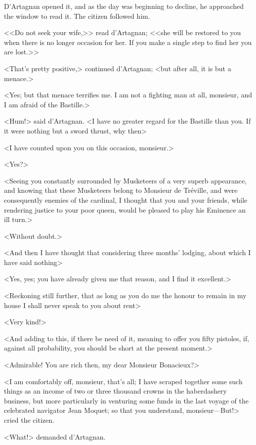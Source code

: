 D'Artagnan opened it, and as the day was beginning to decline, he approached the window to read it. The citizen followed him. 

<<Do not seek your wife,>> read d'Artagnan; <<she will be restored to you when there is no longer occasion for her. If you make a single step to find her you are lost.>>

<That's pretty positive,> continued d'Artagnan; <but after all, it is but a menace.> 

<Yes; but that menace terrifies me. I am not a fighting man at all, monsieur, and I am afraid of the Bastille.> 

<Hum!> said d'Artagnan. <I have no greater regard for the Bastille than you. If it were nothing but a sword thrust, why then\longdash> 

<I have counted upon you on this occasion, monsieur.> 

<Yes?> 

<Seeing you constantly surrounded by Musketeers of a very superb appearance, and knowing that these Musketeers belong to Monsieur de Tréville, and were consequently enemies of the cardinal, I thought that you and your friends, while rendering justice to your poor queen, would be pleased to play his Eminence an ill turn.> 

<Without doubt.> 

<And then I have thought that considering three months' lodging, about which I have said nothing\longdash> 

<Yes, yes; you have already given me that reason, and I find it excellent.> 

<Reckoning still further, that as long as you do me the honour to remain in my house I shall never speak to you about rent\longdash> 

<Very kind!> 

<And adding to this, if there be need of it, meaning to offer you fifty pistoles, if, against all probability, you should be short at the present moment.> 

<Admirable! You are rich then, my dear Monsieur Bonacieux?> 

<I am comfortably off, monsieur, that's all; I have scraped together some such things as an income of two or three thousand crowns in the haberdashery business, but more particularly in venturing some funds in the last voyage of the celebrated navigator Jean Moquet; so that you understand, monsieur---But!\longdash> cried the citizen. 

<What!> demanded d'Artagnan. 

